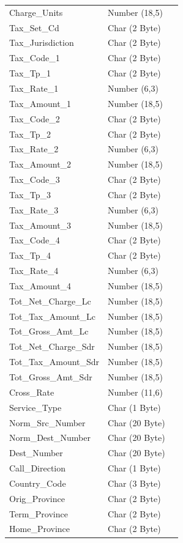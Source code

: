 \documentclass[12pt,twoside]{article}
\begin{document}
\begin{longtable}{l|l|l}
Charge\_Units & Number (18,5) & \\
Tax\_Set\_Cd & Char (2 Byte) & \\
Tax\_Jurisdiction & Char (2 Byte) & \\
Tax\_Code\_1 & Char (2 Byte) & \\
Tax\_Tp\_1 & Char (2 Byte) & \\
Tax\_Rate\_1 & Number (6,3) & \\
Tax\_Amount\_1 & Number (18,5) & \\
Tax\_Code\_2 & Char (2 Byte) & \\
Tax\_Tp\_2 & Char (2 Byte) & \\
Tax\_Rate\_2 & Number (6,3) & \\
Tax\_Amount\_2 & Number (18,5) & \\
Tax\_Code\_3 & Char (2 Byte) & \\
Tax\_Tp\_3 & Char (2 Byte) & \\
Tax\_Rate\_3 & Number (6,3) & \\
Tax\_Amount\_3 & Number (18,5) & \\
Tax\_Code\_4 & Char (2 Byte) & \\
Tax\_Tp\_4 & Char (2 Byte) & \\
Tax\_Rate\_4 & Number (6,3) & \\
Tax\_Amount\_4 & Number (18,5) & \\
Tot\_Net\_Charge\_Lc & Number (18,5) & \\
Tot\_Tax\_Amount\_Lc & Number (18,5) & \\
Tot\_Gross\_Amt\_Lc & Number (18,5) & \\
Tot\_Net\_Charge\_Sdr & Number (18,5) & \\
Tot\_Tax\_Amount\_Sdr & Number (18,5) & \\
Tot\_Gross\_Amt\_Sdr & Number (18,5) & \\
Cross\_Rate & Number (11,6) & \\
Service\_Type & Char (1 Byte) & \\
Norm\_Src\_Number & Char (20 Byte) & \\
Norm\_Dest\_Number & Char (20 Byte) & \\
Dest\_Number & Char (20 Byte) & \\
Call\_Direction & Char (1 Byte) & \\
Country\_Code & Char (3 Byte) & \\
Orig\_Province & Char (2 Byte) & \\
Term\_Province & Char (2 Byte) & \\
Home\_Province & Char (2 Byte) & \\

\end{longtable}
\end{document}
